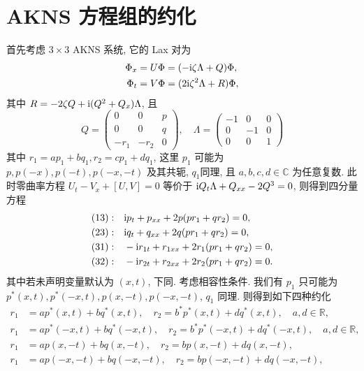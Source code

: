 \section{AKNS 方程组的约化}
首先考虑 $ 3 \times 3 $ AKNS 系统, 它的 Lax 对为
\begin{align}
    \Phi_{x} & = U \Phi = (-\mathrm{i} \zeta \Lambda + Q)\Phi, \label{ch4-eq-AKNS-Lax-Pair-x}       \\
    \Phi_{t} & = V \Phi = (2 \mathrm{i} \zeta^{2} \Lambda + R)\Phi,  \label{ch4-eq-AKNS-Lax-Pair-t}
\end{align}
其中 $R=- 2\zeta Q + \mathrm{i}(Q^{2} + Q_{x})\Lambda $, 且
\begin{equation}
    Q = \begin{pmatrix}
        0      & 0      & p \\
        0      & 0      & q \\
        -r_{1} & -r_{2} & 0
    \end{pmatrix}, \quad
    \Lambda = \begin{pmatrix}
        -1 & 0  & 0 \\
        0  & -1 & 0 \\
        0  & 0  & 1
    \end{pmatrix}
\end{equation}
其中 $ r_{1} = ap_{1} + bq_{1}, r_{2} = cp_{1} + dq_{1}$, 这里 $ p_{1} $ 可能为 $ p, p(-x), p(-t), p(-x,-t)$ 及其共轭, $ q_{1} $同理, 且 $ a, b, c, d \in \mathbb{C} $ 为任意复数. 此时零曲率方程 $U_{t} - V_{x} + [U,V] = 0$ 等价于 $\mathrm{i} Q_{t} \Lambda + Q_{xx} - 2 Q^{3} = 0$, 则得到四分量方程
\begin{align}
    (13): \quad & \mathrm{i} p_{t} + p_{xx} + 2p(pr_{1} + qr_{2}) = 0,    \label{ch4-eq-4-component-AKNS-components-13}     \\
    (23): \quad & \mathrm{i} q_{t} + q_{xx} + 2q(pr_{1} + qr_{2}) = 0,   \label{ch4-eq-4-component-AKNS-components-23}      \\
    (31): \quad & -\mathrm{i} r_{1t} + r_{1xx} + 2r_{1}(pr_{1} + qr_{2}) = 0, \label{ch4-eq-4-component-AKNS-components-31} \\
    (32): \quad & -\mathrm{i} r_{2t} + r_{2xx} + 2r_{2}(pr_{1} + qr_{2}) = 0. \label{ch4-eq-4-component-AKNS-components-32}
\end{align}
其中若未声明变量默认为 $(x,t)$, 下同. 考虑相容性条件. 我们有 $ p_{1} $ 只可能为 $ p^{*}(x,t), p^{*}(-x,t), p(x,-t), p(-x,-t) $, $ q_1 $ 同理. 则得到如下四种约化
\begin{align}
    r_{1} & = a p^{*}(x,t) + b q^{*}(x,t), \quad r_{2} = b^{*} p^{*}(x,t) + d q^{*}(x,t), \quad a, d \in \mathbb{R} \label{ch4-eq-reduction-local},         \\
    r_{1} & = a p^{*}(-x,t) + b q^{*}(-x,t), \quad r_{2} = b^{*} p^{*}(-x,t) + d q^{*}(-x,t), \quad a, d \in \mathbb{R} \label{ch4-eq-reduction-reverse-x}, \\
    r_{1} & = a p(x,-t) + b q(x,-t), \quad r_{2} = b p(x,-t) + d q(x,-t), \label{ch4-eq-reduction-reverse-t}                                                \\
    r_{1} & = a p(-x,-t) + b q(-x,-t) , \quad r_{2} = b p(-x,-t) + d q(-x,-t), \label{ch4-eq-reduction-reverse-x-t}
\end{align}
